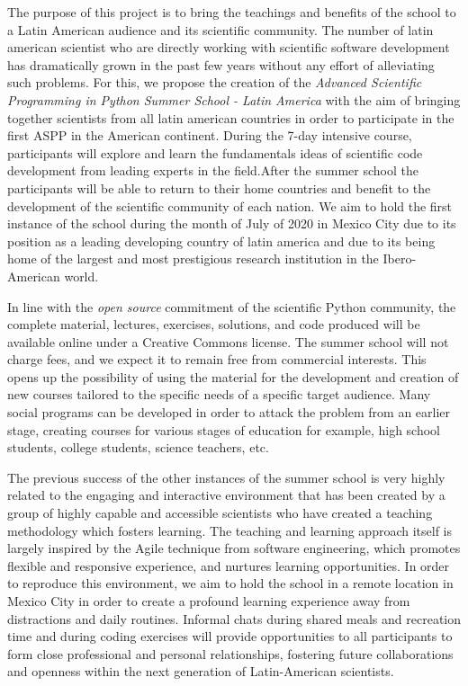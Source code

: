 \documentclass{article}[11pt]
\begin{document}
The purpose of this project is to bring the teachings and benefits of the
school to a Latin American audience and its scientific community. The number of
latin american scientist who are directly working with scientific software
development has dramatically grown in the past few years without any effort of
alleviating such problems. For this, we propose the creation of the
\emph{Advanced Scientific Programming in Python Summer School - Latin America}
with the aim of bringing together scientists from all latin american countries
in order to participate in the first ASPP in the American continent. During the
7-day intensive course, participants will explore and learn the fundamentals
ideas of scientific code development from leading experts in the field.After
the summer school the participants will be able to return to their home
countries and benefit to the development of the scientific community of each
nation.  We aim to hold the first instance of the school during the month of
July of 2020 in Mexico City due to its position as a leading developing country
of latin america and due to its being home of the largest and most prestigious
research institution in the Ibero-American world.

In line with the \emph{open source} commitment of the scientific Python
community, the complete material, lectures, exercises, solutions, and code
produced will be available online under a Creative Commons license. The summer
school will not charge fees, and we expect it to remain free from commercial
interests. This opens up the possibility of using the material for the
development and creation of new courses tailored to the specific needs of a
specific target audience. Many social programs can be developed in order to
attack the problem from an earlier stage, creating courses for various stages
of education for example, high school students, college students, science
teachers, etc.

The previous success of the other instances of the summer school is very highly
related to the engaging and interactive environment that has been created by a
group of highly capable and accessible scientists who have created a teaching
methodology which fosters learning. The teaching and learning approach itself
is largely inspired by the Agile technique from software engineering, which
promotes flexible and responsive experience, and nurtures learning
opportunities. In order to reproduce this environment, we aim to hold the
school in a remote location in Mexico City in order to create a profound
learning experience away from distractions and daily routines. Informal chats
during shared meals and recreation time and during coding exercises will
provide opportunities to all participants to form close professional and
personal relationships, fostering future collaborations and openness within the
next generation of Latin-American scientists.
\end{document}
